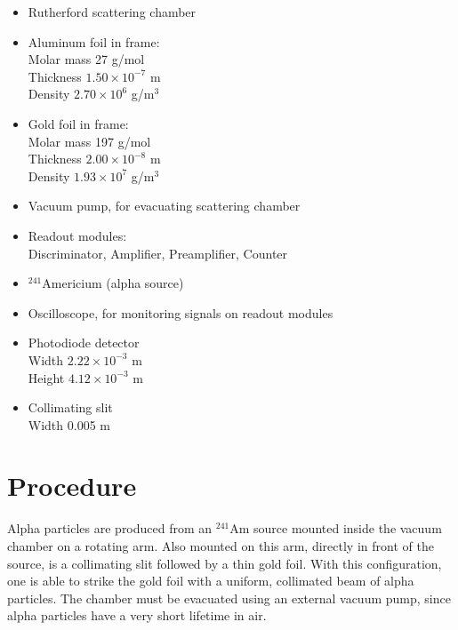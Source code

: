 \documentclass[a4paper]{article}
\begin{document}
\begin{itemize}
\item Rutherford scattering chamber 
\item Aluminum foil in frame:  \\
      Molar mass 27 g/mol \\
      Thickness $1.50 \times 10^{-7}$ m \\
      Density $2.70 \times 10^6$ g/m$^3$ 
\item Gold foil in frame: \\
      Molar mass 197 g/mol \\
      Thickness $2.00 \times 10^{-8}$ m \\
      Density $1.93 \times 10^7$ g/m$^3$ 
\item Vacuum pump, for evacuating scattering chamber
\item Readout modules: \\
      Discriminator, Amplifier, Preamplifier, Counter
\item $ ^{241}$Americium (alpha source)
\item Oscilloscope, for monitoring signals on readout modules
\item Photodiode detector \\
	  Width $2.22 \times 10^{-3}$ m \\
	  Height $4.12 \times 10^{-3}$ m 
\item Collimating slit \\
      Width 0.005 m 
\end{itemize}

\begin{figure}[H]
\centering
\label{name}
\end{figure}

\section{Procedure}


\qq Alpha particles are produced from an $^{241}$Am source mounted inside the vacuum chamber on a rotating arm. Also mounted on this arm, directly in front of the source, is a collimating slit followed by a thin gold foil. With this configuration, one is able to strike the gold foil with a uniform, collimated beam of alpha particles. The chamber must be evacuated using an external vacuum pump, since alpha particles have a very short lifetime in air.
\end{document}
